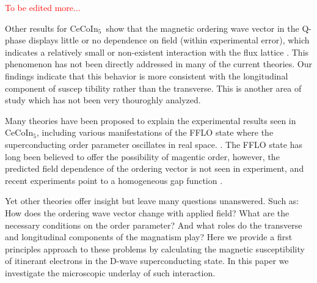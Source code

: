 \documentclass[aps,prl,twocolumn,showpacs,amsmath,amssymb]{revtex4-1}
\newcommand{\red}{\textcolor{red}}
\newcommand{\cecoin}{CeCoIn$_5$}
\begin{document}
\red{To be edited more...} 

Other results for \cecoin\ show that the magnetic ordering wave vector in the
Q-phase displays little or no dependence on field (within experimental error),
which indicates a relatively small or non-existent interaction with the flux
lattice \cite{cecoin5_Kenzelmann2}. This phenomenon has not been directly
addressed in many of the current theories. Our findings indicate that this
behavior is more consistent with the longitudinal component of suscep	tibility
rather than the transverse. This is another area of study which has not been
very thouroghly analyzed.

Many theories have been proposed to explain the experimental results seen in
\cecoin, including various manifestations of the FFLO state where the
superconducting order parameter oscillates in real space.
\cite{sc_sdw_anton,mag_afm_fflo_sigrist,fflo_pen_depth,sc_afm_kato,sc_afm_ikeda,sdw_vortex}.
The FFLO state has long been believed to offer the possibility of magentic
order, however, the predicted field dependence of the ordering vector is not
seen in experiment, and recent experiments point to a homogeneous gap function
\cite{cecoin5_Kenzelmann2,cooperPairsCeCoIn5}.

Yet other theories offer insight but leave many questions unanswered. Such as:
How does the ordering wave vector change with applied field? What are the
necessary conditions on the order parameter? And what roles do the transverse
and longitudinal components of the magnatism play? Here we provide a first
principles approach to these problems by calculating the magnetic
susceptibility of itinerant electrons in the D-wave superconducting state. 
In this paper we investigate the microscopic underlay of such interaction. 
\end{document}
